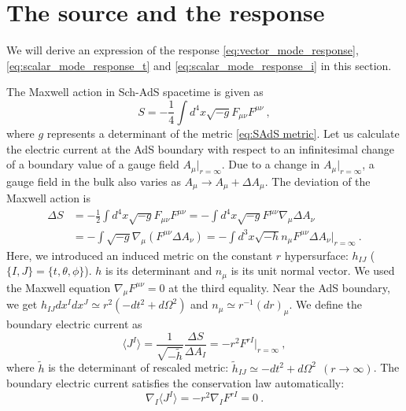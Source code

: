 \documentclass[a4paper,11pt]{article}
\begin{document}
\section{The source and the response}
\label{appendix_response}
    We will derive an expression of the response \eqref{eq:vector_mode_response}, \eqref{eq:scalar_mode_response_t} and \eqref{eq:scalar_mode_response_i} in this section.

    The Maxwell action in Sch-AdS spacetime is given as
    \begin{equation}
        S=-\frac{1}{4} \int d^4x \sqrt{-g}F_{\mu\nu}F^{\mu\nu}\ ,
    \end{equation}
    where $g$ represents a determinant of the metric \eqref{eq:SAdS metric}.
    Let us calculate the electric current at the AdS boundary with respect to an infinitesimal change of a boundary value of a gauge field $A_\mu|_{r=\infty}$. Due to a change in $A_\mu|_{r=\infty}$, a gauge field in the bulk also varies as $A_\mu \rightarrow A_\mu + \Delta A_\mu$. The deviation of the Maxwell action is
    \begin{align}
        \Delta S
        \nonumber&=-\frac{1}{2} \int d^4x \sqrt{-g} F_{\mu\nu} F^{\mu\nu}
        =-\int d^4x \sqrt{-g} F^{\mu\nu}\nabla_\mu \Delta A_\nu\\
        \nonumber&=-\int \sqrt{-g} \nabla_\mu\left( F^{\mu\nu}\Delta A_\nu \right)
        =-\int d^3x \sqrt{-h} n_\mu F^{\mu\nu}\Delta A_\nu|_{r=\infty}\ .
    \end{align}
    Here, we introduced an induced metric on the constant $r$ hypersurface: $h_{IJ}$ ($\{I,J\}=\{t,\theta,\phi\}$). $h$ is its determinant and $n_\mu$ is its unit normal vector.
    We used the Maxwell equation $\nabla_\mu F^{\mu\nu}=0$ at the third equality. 
    Near the AdS boundary, we get $h_{IJ}dx^I dx^J \simeq r^2(-dt^2 + d\Omega^2)$ and $n_\mu \simeq r^{-1} (dr)_\mu$. 
    We define the boundary electric current as
    \begin{equation}
        \langle J^I \rangle = \frac{1}{\sqrt{-\tilde{h}}}\frac{\Delta S}{\Delta A_I}=-r^2 F^{rI}|_{r=\infty}\ ,
    \end{equation}
    where $\tilde{h}$ is the determinant of rescaled metric: $\tilde{h}_{IJ} \simeq -dt^2 + d\Omega^2\ \ (r\to\infty)$. The boundary electric current satisfies the conservation law automatically:
    \begin{equation}
        \nabla_I \langle J^I \rangle  = -r^2 \nabla_I F^{rI}=0\ .
    \end{equation}
\end{document}
